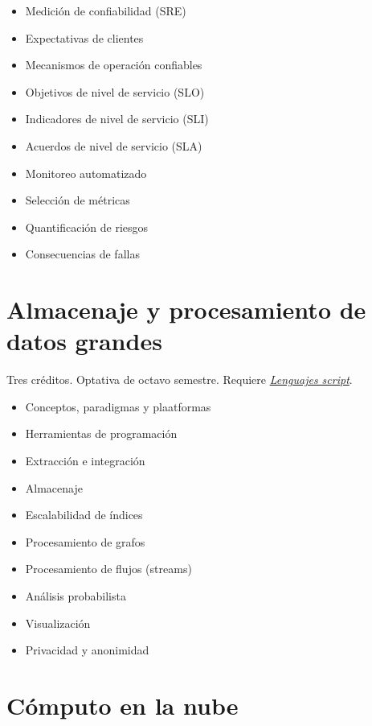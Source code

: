 \documentclass{article}
\begin{document}
\begin{multicols}{4}
\begin{itemize}
\item{Medici\'{o}n de confiabilidad (SRE)}
\item{Expectativas de clientes}
\item{Mecanismos de operaci\'{o}n confiables}
\item{Objetivos de nivel de servicio (SLO)}
\item{Indicadores de nivel de servicio (SLI)}
\item{Acuerdos de nivel de servicio (SLA)}
\item{Monitoreo automatizado}
\item{Selecci\'{o}n de m\'{e}tricas}
\item{Quantificaci\'{o}n de riesgos}
\item{Consecuencias de fallas}
\end{itemize}

\vfill\null \columnbreak

\hypertarget{ayp}{\section*{Almacenaje y procesamiento de datos grandes}}

Tres cr\'{e}ditos.
Optativa de octavo semestre. Requiere
\hyperlink{ls}{\em Lenguajes script}.

\begin{itemize}
\item{Conceptos, paradigmas y plaatformas}
\item{Herramientas de programaci\'{o}n}
\item{Extracci\'{o}n e integraci\'{o}n}
\item{Almacenaje}
\item{Escalabilidad de \'{i}ndices}
\item{Procesamiento de grafos}
\item{Procesamiento de flujos (streams)}
\item{An\'{a}lisis probabilista}
\item{Visualizaci\'{o}n}
\item{Privacidad y anonimidad}
\end{itemize}

\vfill\null \columnbreak

\hypertarget{celn}{\section*{C\'{o}mputo en la nube}} 


\end{multicols}
\end{document}
